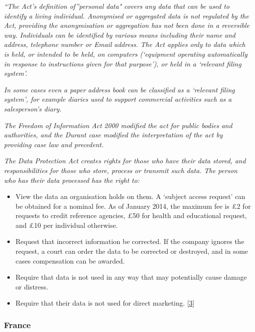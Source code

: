 \emph{``The Act's definition of''personal data" covers any data that can be used to identify a living individual. Anonymised or aggregated data is not regulated by the Act, providing the anonymisation or aggregation has not been done in a reversible way.
Individuals can be identified by various means including their name and address, telephone number or
Email address.
The Act applies only to data which is held, or intended to be held, on computers (`equipment operating automatically in response to instructions given for that purpose'), or held in a `relevant filing system'.}

\emph{In some cases even a paper address book can be classified as a `relevant filing system', for example diaries used to support commercial activities such as a salesperson's diary.}

\emph{The Freedom of Information Act 2000 modified the act for public bodies and authorities, and the Durant case modified the interpretation of the act by providing case law and precedent.}

\emph{The Data Protection Act creates rights for those who have their data stored, and responsibilities for those who store, process or transmit such data.
The person who has their data processed has the right to:}

\begin{itemize}

\item
View the data an organisation holds on them.
A `subject access request' can be obtained for a nominal fee. As of January 2014, the maximum fee is £2 for requests to credit reference agencies, £50 for health and educational request, and £10 per individual otherwise.

\item
Request that incorrect information be corrected.
If the company ignores the request, a court can order the data to be corrected or destroyed, and in some cases compensation can be awarded.

\item
Require that data is not used in any way that may potentially cause damage or distress.

\item
Require that their data is not used for direct marketing. {[}\hyperref[references]{3}{]}
\end{itemize}

\subsubsection*{France}

